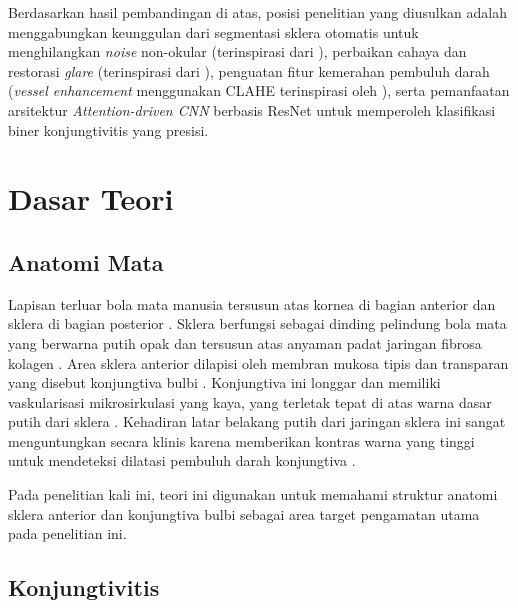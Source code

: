 Berdasarkan hasil pembandingan di atas, posisi penelitian yang diusulkan adalah menggabungkan keunggulan dari segmentasi sklera otomatis untuk menghilangkan \textit{noise} non-okular (terinspirasi dari \textcite{jiang2023automatic}), perbaikan cahaya dan restorasi \textit{glare} (terinspirasi dari \textcite{fuentes2025illumination}), penguatan fitur kemerahan pembuluh darah (\textit{vessel enhancement} menggunakan CLAHE terinspirasi oleh \textcite{madhusudhan2026deep}), serta pemanfaatan arsitektur \textit{Attention-driven CNN} berbasis ResNet \parencite{sangeethaa2024enhanced} untuk memperoleh klasifikasi biner konjungtivitis yang presisi.

\section{Dasar Teori}
\label{sec:dasar-teori}

\subsection{Anatomi Mata}
\label{subsec:anatomi-mata}

Lapisan terluar bola mata manusia tersusun atas kornea di bagian anterior dan sklera di bagian posterior \parencite{wandini2024konjungtivitis}. Sklera berfungsi sebagai dinding pelindung bola mata yang berwarna putih opak dan tersusun atas anyaman padat jaringan fibrosa kolagen \parencite{wandini2024konjungtivitis}. Area sklera anterior dilapisi oleh membran mukosa tipis dan transparan yang disebut konjungtiva bulbi \parencite{sitompul2017konjungtivitis}. Konjungtiva ini longgar dan memiliki vaskularisasi mikrosirkulasi yang kaya, yang terletak tepat di atas warna dasar putih dari sklera \parencite{wandini2024konjungtivitis}. Kehadiran latar belakang putih dari jaringan sklera ini sangat menguntungkan secara klinis karena memberikan kontras warna yang tinggi untuk mendeteksi dilatasi pembuluh darah konjungtiva \parencite{sitompul2017konjungtivitis, wandini2024konjungtivitis}.

Pada penelitian kali ini, teori ini digunakan untuk memahami struktur anatomi sklera anterior dan konjungtiva bulbi sebagai area target pengamatan utama pada penelitian ini.

\subsection{Konjungtivitis}
\label{subsec:konjungtivitis}

